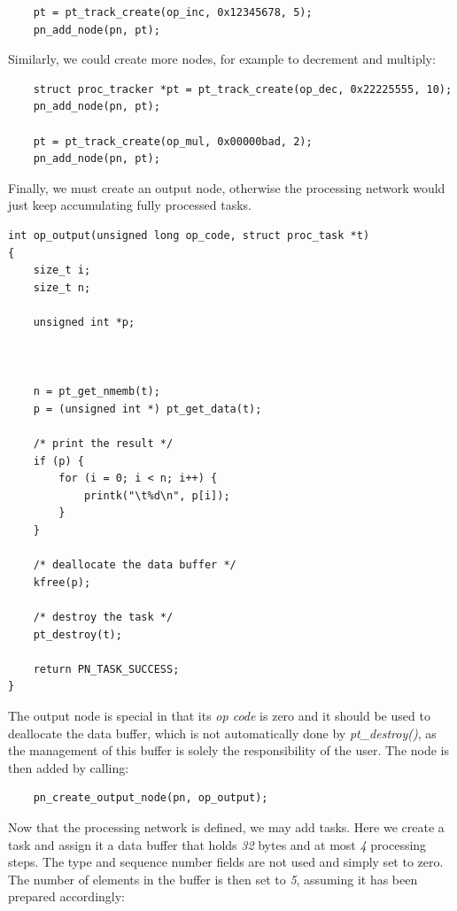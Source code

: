 \begin{lstlisting}
	pt = pt_track_create(op_inc, 0x12345678, 5);
	pn_add_node(pn, pt);
\end{lstlisting}

\noindent
Similarly, we could create more nodes, for example to decrement and multiply:

\begin{lstlisting}
	struct proc_tracker *pt = pt_track_create(op_dec, 0x22225555, 10);
	pn_add_node(pn, pt);

	pt = pt_track_create(op_mul, 0x00000bad, 2);
	pn_add_node(pn, pt);
\end{lstlisting}

\noindent
Finally, we must create an output node, otherwise the processing network
would just keep accumulating fully processed tasks.

\begin{minipage}{\linewidth}
\begin{lstlisting}
int op_output(unsigned long op_code, struct proc_task *t)
{
	size_t i;
	size_t n;

	unsigned int *p;



	n = pt_get_nmemb(t);
	p = (unsigned int *) pt_get_data(t);

	/* print the result */
	if (p) {
		for (i = 0; i < n; i++) {
			printk("\t%d\n", p[i]);
		}
	}

	/* deallocate the data buffer */
	kfree(p);

	/* destroy the task */
	pt_destroy(t);

	return PN_TASK_SUCCESS;
}
\end{lstlisting}
\end{minipage}

\noindent
The output node is special in that its \emph{op code} is zero and it should 
be used to deallocate the data buffer, which is not automatically done by
\emph{pt\_destroy()}, as the management of this buffer is solely the
responsibility of the user. The node is then added by calling:

\begin{lstlisting}
	pn_create_output_node(pn, op_output);
\end{lstlisting}

\noindent Now that the processing network is defined, we may add tasks. Here we
create a task and assign it  a data buffer that holds \emph{32} bytes and at
most \emph{4} processing steps. The type and sequence number fields are not
used and simply set to zero. The number of elements in the buffer is then set
to \emph{5}, assuming it has been prepared accordingly:


